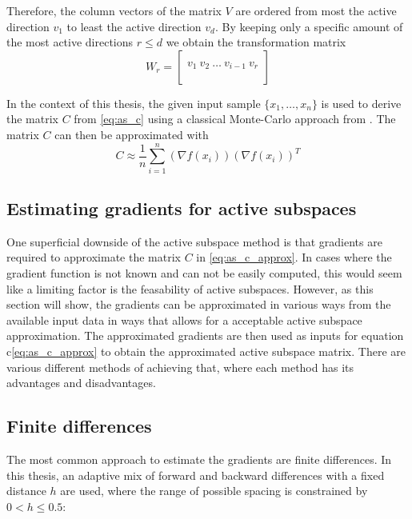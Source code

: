 \documentclass[
  a4paper,  %
  twoside,  %
  bibliography=totoc,
  headsepline,
  cleardoublepage=empty,
  parskip=half,
  draft=false
]{scrbook}
\begin{document}
Therefore, the column vectors of the matrix $V$ are ordered from most the active direction $v_1$ to least the active direction $v_d$.
By keeping only a specific amount of the most active directions $r \leq d$ we obtain the transformation matrix
\begin{equation}
W_r=\begin{bmatrix}
  \\
    v_1 ~ v_2 ~ \dots ~ v_{i-1} ~ v_r\\
    \\
  \end{bmatrix}
\label{basis}
\end{equation}

In the context of this thesis, the given input sample $\{x_1, \dots, x_n\}$ is used to derive the matrix $C$ from \cref{eq:as_c} using a classical Monte-Carlo approach from \cite{}.
The matrix $C$ can then be approximated with
\begin{equation}
C \approx \frac{1}{n} \sum_{i=1}^n  (\nabla f(x_i)) (\nabla f(x_i))^T
\label{eq:as_c_approx}
\end{equation}

\subsection{Estimating gradients for active subspaces}
\label{sec:as_est}

One superficial downside of the active subspace method is that gradients are required to approximate the matrix $C$ in \cref{eq:as_c_approx}.
In cases where the gradient function is not known and can not be easily computed, this would seem like a limiting factor is the feasability of active subspaces.
However, as this section will show, the gradients can be approximated in various ways from the available input data in ways that allows for a acceptable active subspace approximation.
The approximated gradients are then used as inputs for equation c\cref{eq:as_c_approx} to obtain the approximated active subspace matrix.
There are various different methods of achieving that, where each method has its advantages and disadvantages.

\subsection{Finite differences}

The most common approach to estimate the gradients are finite differences.
In this thesis, an adaptive mix of forward and backward differences with a fixed distance $h$ are used, where the range of possible spacing is constrained by $0 < h \leq 0.5$:
\end{document}
